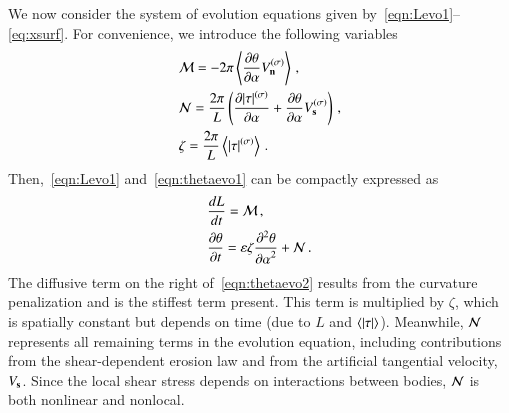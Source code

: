 \documentclass[preprint, 10pt]{elsarticle}
\begin{document}
We now consider the system of evolution equations given by~\eqref{eqn:Levo1}--\eqref{eq:xsurf}. For convenience, we introduce the following variables
\begin{align}
& \mathcal{M} = - 2 \pi \left< \frac{\partial \theta}{\partial \alpha} V_{\mathbf{n}}^{(\sigma)} \right> \, , \\
& \mathcal{N} = \frac{2 \pi}{L} \left( \frac{\partial \lvert \tau \rvert^{(\sigma)}}{\partial \alpha} + \frac{\partial \theta}{\partial \alpha}
V_{\mathbf{s}}^{(\sigma)} \right) \, , \\
& \zeta = \frac{2 \pi}{L}  \left< \lvert \tau \rvert^{(\sigma)} \right> \, .
\end{align}
Then,~\eqref{eqn:Levo1} and~\eqref{eqn:thetaevo1} can be compactly expressed as
\begin{align}
\label{eqn:Levo2}
& \frac{d L}{d t} = \mathcal{M} \, , \\
\label{eqn:thetaevo2}
& \frac{\partial \theta}{\partial t} = \varepsilon \zeta \frac{\partial^2 \theta}{{\partial \alpha}^2} + \mathcal{N} \,.
\end{align}
The diffusive term on the right of~\eqref{eqn:thetaevo2} results from the curvature penalization and is the stiffest term present. This term is multiplied by $\zeta$, which is spatially constant but depends on time (due to $L$ and $\left< \lvert \tau \rvert \right>$). Meanwhile, $\mathcal{N}$ represents all remaining terms in the evolution equation, including contributions from the shear-dependent erosion law and from the artificial tangential velocity, $V_{\mathbf{s}}$. Since the local shear stress depends on interactions between bodies, $\mathcal{N}$ is both nonlinear and nonlocal.
\end{document}
